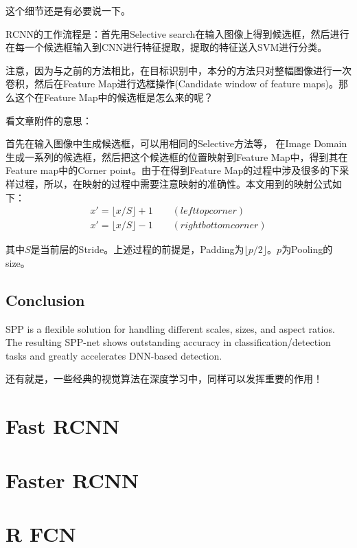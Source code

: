 这个细节还是有必要说一下。

RCNN的工作流程是：首先用Selective search在输入图像上得到候选框，然后进行在每一个候选框输入到CNN进行特征提取，提取的特征送入SVM进行分类。

注意，因为与之前的方法相比，在目标识别中，本分的方法只对整幅图像进行一次卷积，然后在Feature Map进行选框操作(Candidate window of feature maps)。那么这个在Feature Map中的候选框是怎么来的呢？

看文章附件的意思：

首先在输入图像中生成候选框，可以用相同的Selective方法等， 在Image Domain生成一系列的候选框，然后把这个候选框的位置映射到Feature Map中，得到其在Feature map中的Corner point。由于在得到Feature Map的过程中涉及很多的下采样过程，所以，在映射的过程中需要注意映射的准确性。本文用到的映射公式如下：
\begin{displaymath}
\begin{gathered}
x' = \lfloor x/S  \rfloor + 1 \qquad  (left top corner)\\
x' = \lfloor x/S \rfloor - 1 \qquad (right bottom corner)
\end{gathered}
\end{displaymath}

其中$S$是当前层的Stride。上述过程的前提是，Padding为$\lfloor p/2 \rfloor$。$p$为Pooling的size。

\subsection{Conclusion}

SPP is a flexible solution for handling different scales, sizes, and aspect ratios. The resulting SPP-net shows outstanding accuracy in classification/detection tasks and greatly accelerates DNN-based detection.

还有就是，一些经典的视觉算法在深度学习中，同样可以发挥重要的作用！

\section{Fast RCNN}

\section{Faster RCNN}

\section{R FCN}


